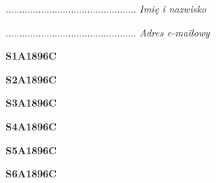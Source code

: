 \begin{turn}{90}\begin{minipage}{\linewidth} \vspace{20mm} ................................................  \textit{Imię i nazwisko}\end{minipage}\end{turn}

\begin{turn}{90}\begin{minipage}{\linewidth} \vspace{20mm} ................................................  \textit{Adres e-mailowy}\end{minipage}\end{turn}

\begin{turn}{90}\huge \begin{minipage}{\linewidth} \vspace{10mm}\textbf{S1A1896C}\end{minipage}\end{turn}

\begin{turn}{90}\huge \begin{minipage}{\linewidth} \vspace{10mm}\textbf{S2A1896C}\end{minipage}\end{turn}

\begin{turn}{90}\huge \begin{minipage}{\linewidth} \vspace{10mm}\textbf{S3A1896C}\end{minipage}\end{turn}

\begin{turn}{90}\huge \begin{minipage}{\linewidth} \vspace{10mm}\textbf{S4A1896C}\end{minipage}\end{turn}

\begin{turn}{90}\huge \begin{minipage}{\linewidth} \vspace{10mm}\textbf{S5A1896C}\end{minipage}\end{turn}

\begin{turn}{90}\huge \begin{minipage}{\linewidth} \vspace{10mm}\textbf{S6A1896C}\end{minipage}\end{turn}

